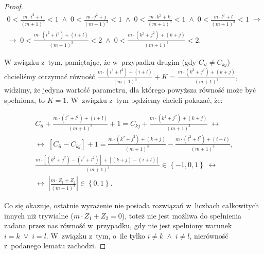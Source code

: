 \begin{proof}
	\begin{gather}
		0 < \frac{m \cdot i^{2} + i}{\left( m + 1 \right)^{3}} < 1 \; \wedge \; 0 < \frac{m \cdot j^{2} + j}{\left( m + 1 \right)^{3}} < 1 \; \wedge \; 0 < \frac{m \cdot k^{2} + k}{\left( m + 1 \right)^{3}} < 1 \; \wedge \; 0 < \frac{m \cdot l^{2} + l}{\left( m + 1 \right)^{3}} < 1 \; \rightarrow \\
		\rightarrow \; 0 < \frac{m \cdot \left( i^{2} + l^{2} \right) + \left( i + l \right)}{\left( m + 1 \right)^{3}} < 2 \; \wedge \; 0 < \frac{m \cdot \left( k^{2} + j^{2} \right) + \left( k + j \right)}{\left( m + 1 \right)^{3}} < 2\text{.}
	\end{gather}
	
	W związku z~tym, pamiętając, że w~przypadku drugim (gdy $C_{il} \neq C_{kj}$) chcieliśmy otrzymać równość $\frac{m \cdot \left( i^{2} + l^{2} \right) + \left( i + l \right)}{\left( m + 1 \right)^{3}} + K = \frac{m \cdot \left( k^{2} + j^{2} \right) + \left( k + j \right)}{\left( m + 1 \right)^{3}}$, widzimy, że jedyna wartość parametru, dla którego powyższa równość może być spełniona, to $K = 1$.
	W~związku z~tym będziemy chcieli pokazać, że:
	
	\begin{gather}
		C_{il} + \frac{m \cdot \left( i^{2} + l^{2} \right) + \left( i + l \right)}{\left( m + 1 \right)^{3}} + 1 = C_{kj} + \frac{m \cdot \left( k^{2} + j^{2} \right) + \left( k + j \right)}{\left( m + 1 \right)^{3}} \; \leftrightarrow \\
		\leftrightarrow \; \left[ C_{il} - C_{kj} \right] + 1 = \frac{m \cdot \left( k^{2} + j^{2} \right) + \left( k + j \right)}{\left( m + 1 \right)^{3}} - \frac{m \cdot \left( i^{2} + l^{2} \right) + \left( i + l \right)}{\left( m + 1 \right)^{3}}\text{,} \\
		\frac{m \cdot \left[ \left( k^{2} + j^{2} \right) - \left( i^{2} + l^{2} \right) \right] + \left[ \left( k + j \right) - \left( i + l \right) \right]}{\left( m + 1 \right)^{3}} \in \left\{ -1, 0, 1 \right\} \; \leftrightarrow \\
		\leftrightarrow \; \left| \frac{m \cdot Z_{1} + Z_{2}}{\left( m + 1 \right)^{3}} \right| \in \left\{ 0, 1 \right\}\text{.}
	\end{gather}
	
	Co się okazuje, ostatnie wyrażenie nie posiada rozwiązań w~liczbach całkowitych innych niż trywialne ($m \cdot Z_{1} + Z_{2} = 0$), toteż nie jest możliwa do spełnienia zadana przez nas równość w~przypadku, gdy nie jest spełniony warunek $i = k \; \vee \; i = l$. 
	W~związku z~tym, o~ile tylko $i \neq k \; \wedge \; i \neq l$, nierówność z~podanego lematu zachodzi.
\end{proof}

